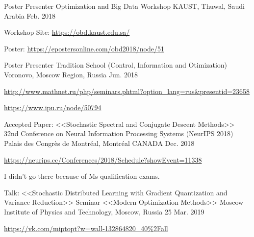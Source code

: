 


\begin{cventries}


\cventry
{Poster Presenter} %
{Optimization and Big Data Workshop} %
{KAUST, Thuwal, Saudi Arabia} %
{Feb. 2018} %
{ %
	\begin{cvitems}
		\item {Workshop Site: \url{https://obd.kaust.edu.sa/}}
		\item {Poster: \url{ https://epostersonline.com/obd2018/node/51}}
	\end{cvitems}
}

\cventry
{Poster Presenter} %
{Tradition School (Control, Information and Otimization)} %
{Voronovo, Moscow Region, Russia} %
{Jun. 2018} %
{ %
	\begin{cvitems}
		\item {\url{http://www.mathnet.ru/php/seminars.phtml?option_lang=rus&presentid=23658}}
		\item {\url{https://www.ipu.ru/node/50794}}
	\end{cvitems}
}

\cventry
{Accepted Paper: <<Stochastic Spectral and Conjugate Descent Methods>>} %
{32nd Conference on Neural Information Processing Systems (NeurIPS 2018)} %
{Palais des Congrès de Montréal, Montréal CANADA} %
{Dec. 2018} %
{ %
	\begin{cvitems}
		\item {\url{https://neurips.cc/Conferences/2018/Schedule?showEvent=11338}}
		\item {I didn't go there because of Ms qualification exams.}
	\end{cvitems}
}

\cventry
{Talk: <<Stochastic Distributed Learning with Gradient Quantization and Variance Reduction>>}
{Seminar <<Modern Optimization Methods>>}
{Moscow Institute of Physics and Technology, Moscow, Russia}
{25 Mar. 2019}
{
\begin{cvitems}
	\item {\url{https://vk.com/miptopt?w=wall-132864820_40\%2Fall}}
\end{cvitems}
}


\end{cventries}
